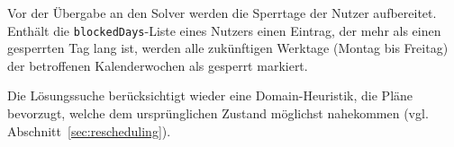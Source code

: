 Vor der Übergabe an den Solver werden die Sperrtage der Nutzer aufbereitet. Enthält die \texttt{blockedDays}-Liste eines Nutzers einen Eintrag, der mehr als einen gesperrten Tag lang ist, werden alle zukünftigen Werktage (Montag bis Freitag) der betroffenen Kalenderwochen als gesperrt markiert. 

Die Lösungssuche berücksichtigt wieder eine Domain-Heuristik, die Pläne bevorzugt, welche dem ursprünglichen Zustand möglichst nahekommen (vgl. Abschnitt~\ref{sec:rescheduling}).



